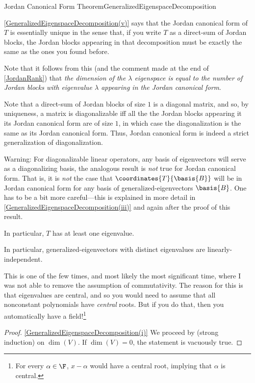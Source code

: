 \begin{thm}{Jordan Canonical Form Theorem}{GeneralizedEigenspaceDecomposition}
\begin{rmk}
		\cref{GeneralizedEigenspaceDecomposition(v)} says that the Jordan canonical form of $T$ is essentially unique in the sense that, if you write $T$ as a direct-sum of Jordan blocks, the Jordan blocks appearing in that decomposition must be exactly the same as the ones you found before.
	\end{rmk}
	\begin{rmk}
		Note that it follows from this (and the comment made at the end of \cref{JordanRank}) that \emph{the dimension of the $\lambda$ eigenspace is equal to the number of Jordan blocks with eigenvalue $\lambda$ appearing in the Jordan canonical form}.
	\end{rmk}
	\begin{rmk}
		Note that a direct-sum of Jordan blocks of size $1$ is a diagonal matrix, and so, by uniqueness, a matrix is diagonalizable iff all the the Jordan blocks appearing it its Jordan canonical form are of size $1$, in which case the diagonalization is the same as its Jordan canonical form.  Thus, Jordan canonical form is indeed a strict generalization of diagonalization.
	\end{rmk}
	\begin{rmk}
		Warning:  For diagonalizable linear operators, any basis of eigenvectors will serve as a diagonalizing basis, the analogous result is \emph{not} true for Jordan canonical form.  That is, it is \emph{not} the case that $\coordinates{T}{\basis{B}}$ will be in Jordan canonical form for any basis of generalized-eigenvectors $\basis{B}$.  One has to be a bit more careful---this is explained in more detail in \cref{GeneralizedEigenspaceDecomposition(iii)} and again after the proof of this result.
	\end{rmk}
	\begin{rmk}
		In particular, $T$ has at least one eigenvalue.
	\end{rmk}
	\begin{rmk}
		In particular, generalized-eigenvectors with distinct eigenvalues are linearly-independent.
	\end{rmk}
	\begin{rmk}
		This is one of the few times, and most likely the most significant time, where I was not able to remove the assumption of commutativity.  The reason for this is that eigenvalues are central, and so you would need to assume that all nonconstant polynomials have \emph{central} roots.  But if you do that, then you automatically have a field!\footnote{For every $\alpha \in \F$, $x-\alpha$ would have a central root, implying that $\alpha$ is central.}
	\end{rmk}
	\begin{proof}
		\cref{GeneralizedEigenspaceDecomposition(i)} We proceed by (strong induction) on $\dim (V)$.  If $\dim (V)=0$, the statement is vacuously true.
		

\end{proof}
\end{thm}
